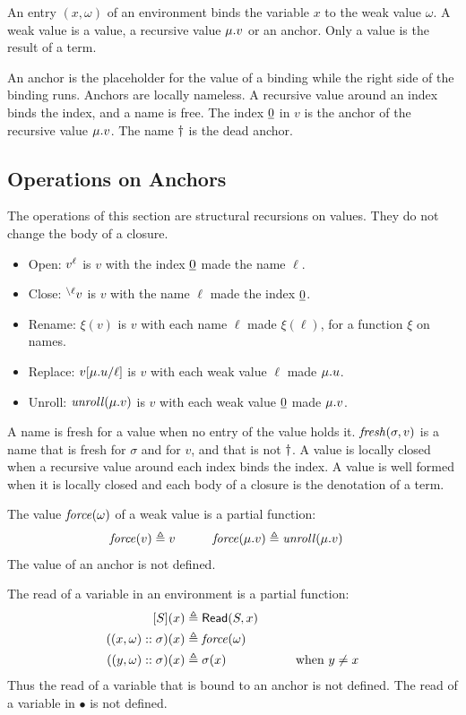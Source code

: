 An entry $(x,\omega)$ of an environment binds the variable $x$ to the weak value $\omega$.
A weak value is a value, a recursive value $\mu.{v}$ or an anchor.
Only a value is the result of a term.

An anchor is the placeholder for the value of a binding while the right side of the binding runs.
Anchors are locally nameless.
A recursive value around an index binds the index, and a name is free.
The index $\underline{0}$ in $v$ is the anchor of the recursive value $\mu.{v}$.
The name $\dagger$ is the dead anchor.

\subsection{Operations on Anchors}\label{sec:ops}

The operations of this section are structural recursions on values.
They do not change the body of a closure.

\begin{itemize}
  \item Open: ${v}^{\ell}$ is $v$ with the index $\underline{0}$ made the name $\ell$.
  \item Close: $\prescript{\backslash{\ell}}{}{v}$ is $v$ with the name $\ell$ made the index $\underline{0}$.
  \item Rename: $\xi(v)$ is $v$ with each name $\ell$ made $\xi(\ell)$, for a function $\xi$ on names.
  \item Replace: ${v}[\mu.{u}/{\ell}]$ is $v$ with each weak value $\ell$ made $\mu.{u}$.
  \item Unroll: $\mathit{unroll}(\mu.{v})$ is $v$ with each weak value $\underline{0}$ made $\mu.{v}$.
\end{itemize}

A name is fresh for a value when no entry of the value holds it.
$\mathit{fresh}(\sigma,v)$ is a name that is fresh for $\sigma$ and for $v$, and that is not $\dagger$.
A value is locally closed when a recursive value around each index binds the index.
A value is well formed when it is locally closed and each body of a closure is the denotation of a term.

The value $\mathit{force}(\omega)$ of a weak value is a partial function:
\begin{alignat*}{2}
  \mathit{force}(v)          & \triangleq v                 & \qquad \mathit{force}(\mu.{v}) & \triangleq\mathit{unroll}(\mu.{v})
\end{alignat*}
The value of an anchor is not defined.

The read of a variable in an environment is a partial function:
\begin{alignat*}{2}
  [S](x)                         & \triangleq\ReadE(S,x)          &                                \\
  ((x,\omega)\cons\sigma)(x)     & \triangleq\forcef(\omega)      &                                \\
  ((y,\omega)\cons\sigma)(x)     & \triangleq\sigma(x)            & \qquad\text{when }y\neq x
\end{alignat*}
Thus the read of a variable that is bound to an anchor is not defined.
The read of a variable in $\bullet$ is not defined.

